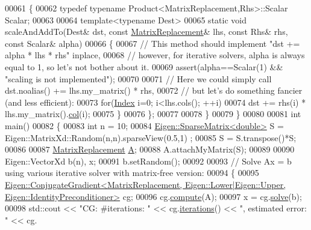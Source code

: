\begin{DoxyCode}
00061   \{
00062     \textcolor{keyword}{typedef} \textcolor{keyword}{typename} Product<MatrixReplacement,Rhs>::Scalar Scalar;
00063 
00064     \textcolor{keyword}{template}<\textcolor{keyword}{typename} Dest>
00065     \textcolor{keyword}{static} \textcolor{keywordtype}{void} scaleAndAddTo(Dest& dst, \textcolor{keyword}{const} \hyperlink{class_matrix_replacement}{MatrixReplacement}& lhs, \textcolor{keyword}{const} Rhs& rhs, \textcolor{keyword}{
      const} Scalar& alpha)
00066     \{
00067       \textcolor{comment}{// This method should implement "dst += alpha * lhs * rhs" inplace,}
00068       \textcolor{comment}{// however, for iterative solvers, alpha is always equal to 1, so let's not bother about it.}
00069       assert(alpha==Scalar(1) && \textcolor{stringliteral}{"scaling is not implemented"});
00070 
00071       \textcolor{comment}{// Here we could simply call dst.noalias() += lhs.my\_matrix() * rhs,}
00072       \textcolor{comment}{// but let's do something fancier (and less efficient):}
00073       \textcolor{keywordflow}{for}(\hyperlink{namespace_eigen_a62e77e0933482dafde8fe197d9a2cfde}{Index} i=0; i<lhs.cols(); ++i)
00074         dst += rhs(i) * lhs.my\_matrix().\hyperlink{group___sparse_core___module_a8f4eaa3c3921ef3823ffc69ebcc356af}{col}(i);
00075     \}
00076   \};
00077 
00078 \}
00079 \}
00080 
00081 \textcolor{keywordtype}{int} main()
00082 \{
00083   \textcolor{keywordtype}{int} n = 10;
00084   \hyperlink{group___sparse_core___module}{Eigen::SparseMatrix<double>} S = Eigen::MatrixXd::Random(n,n).sparseView(0.5,1)
      ;
00085   S = S.transpose()*S;
00086 
00087   \hyperlink{class_matrix_replacement}{MatrixReplacement} \hyperlink{group___core___module_class_eigen_1_1_matrix}{A};
00088   A.attachMyMatrix(S);
00089 
00090   Eigen::VectorXd b(n), x;
00091   b.setRandom();
00092 
00093   \textcolor{comment}{// Solve Ax = b using various iterative solver with matrix-free version:}
00094   \{
00095     
      \hyperlink{group___iterative_linear_solvers___module_class_eigen_1_1_conjugate_gradient}{Eigen::ConjugateGradient<MatrixReplacement, Eigen::Lower|Eigen::Upper, Eigen::IdentityPreconditioner>}
       cg;
00096     cg.\hyperlink{group___iterative_linear_solvers___module_a7dfa55c55e82d697bde227696a630914}{compute}(A);
00097     x = cg.\hyperlink{group___sparse_core___module_a4a66e9498b06e3ec4ec36f06b26d4e8f}{solve}(b);
00098     std::cout << \textcolor{stringliteral}{"CG:       #iterations: "} << cg.\hyperlink{group___iterative_linear_solvers___module_ae778dd098bd5e6655625b20b1e9f15da}{iterations}() << \textcolor{stringliteral}{", estimated error: "} << cg.

\end{DoxyCode}
